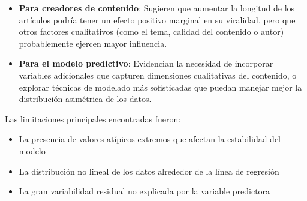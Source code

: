 \documentclass[12pt, a4paper]{article}
\begin{document}
\begin{itemize}
    \item \textbf{Para creadores de contenido}: Sugieren que aumentar la longitud de los artículos podría tener un efecto positivo marginal en su viralidad, pero que otros factores cualitativos (como el tema, calidad del contenido o autor) probablemente ejercen mayor influencia.
    
    \item \textbf{Para el modelo predictivo}: Evidencian la necesidad de incorporar variables adicionales que capturen dimensiones cualitativas del contenido, o explorar técnicas de modelado más sofisticadas que puedan manejar mejor la distribución asimétrica de los datos.
\end{itemize}

Las limitaciones principales encontradas fueron:
\begin{itemize}
    \item La presencia de valores atípicos extremos que afectan la estabilidad del modelo
    \item La distribución no lineal de los datos alrededor de la línea de regresión
    \item La gran variabilidad residual no explicada por la variable predictora
\end{itemize}
\end{document}
